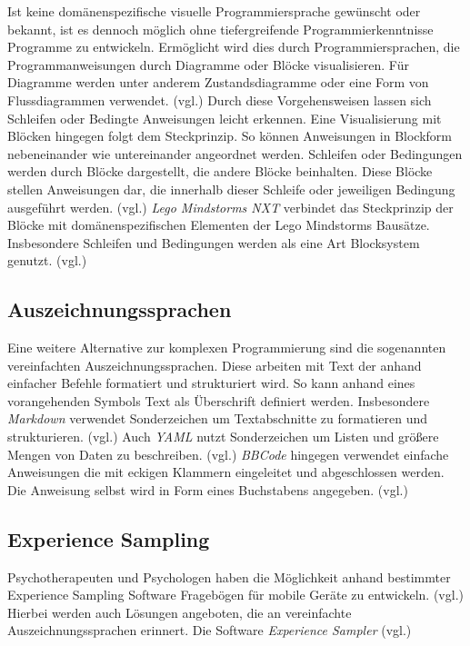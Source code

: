 Ist keine domänenspezifische visuelle Programmiersprache gewünscht oder bekannt, ist es dennoch möglich ohne tiefergreifende Programmierkenntnisse Programme zu entwickeln. Ermöglicht wird dies durch Programmiersprachen, die Programmanweisungen durch Diagramme oder Blöcke visualisieren. Für Diagramme werden unter anderem Zustandsdiagramme oder eine Form von Flussdiagrammen verwendet. (vgl.\cite{SwissEdu45:online}\cite{DRAKONEd12:online}\cite{PureData15:online}) Durch diese Vorgehensweisen lassen sich Schleifen oder Bedingte Anweisungen leicht erkennen. Eine Visualisierung mit Blöcken hingegen folgt dem Steckprinzip. So können Anweisungen in Blockform nebeneinander wie untereinander angeordnet werden. Schleifen oder Bedingungen werden durch Blöcke dargestellt, die andere Blöcke beinhalten. Diese Blöcke stellen Anweisungen dar, die innerhalb dieser Schleife oder jeweiligen Bedingung ausgeführt werden. (vgl.\cite{BlocklyG18:online}\cite{NXTSoftw71:online}\cite{SnapBuil34:online}\cite{squeakla50:online}) \emph{Lego Mindstorms NXT} verbindet das Steckprinzip der Blöcke mit domänenspezifischen Elementen der Lego Mindstorms Bausätze. Insbesondere Schleifen und Bedingungen werden als eine Art Blocksystem genutzt. (vgl.\cite{NXTSoftw71:online})


\subsection{Auszeichnungssprachen}
Eine weitere Alternative zur komplexen Programmierung sind die sogenannten vereinfachten Auszeichnungssprachen. Diese arbeiten mit Text der anhand einfacher Befehle formatiert und strukturiert wird. So kann anhand eines vorangehenden Symbols Text als Überschrift definiert werden. Insbesondere \emph{Markdown} verwendet Sonderzeichen um Textabschnitte zu formatieren und strukturieren. (vgl.\cite{GettingS56:online}) Auch \emph{YAML} nutzt Sonderzeichen um Listen und größere Mengen von Daten zu beschreiben. (vgl.\cite{TheOffic64:online}) \emph{BBCode} hingegen verwendet einfache Anweisungen die mit eckigen Klammern eingeleitet und abgeschlossen werden. Die Anweisung selbst wird in Form eines Buchstabens angegeben. (vgl.\cite{BBCodeor24:online})


\subsection{Experience Sampling}
Psychotherapeuten und Psychologen haben die Möglichkeit anhand bestimmter Experience Sampling Software Fragebögen für mobile Geräte zu entwickeln. (vgl.\cite{OSFSabri6:online}) Hierbei werden auch Lösungen angeboten, die an vereinfachte Auszeichnungssprachen erinnert. Die Software \emph{Experience Sampler} (vgl.\cite{OSFSabri6:online})

